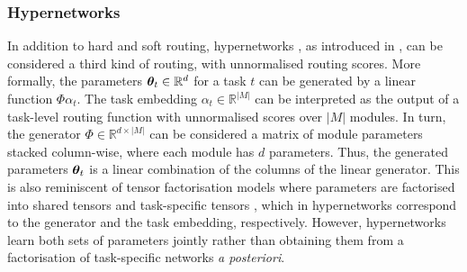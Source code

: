 \documentclass[10pt]{article} %
\begin{document}
\subsubsection{Hypernetworks} \label{sec:routing:hyper_network}

In addition to hard and soft routing, hypernetworks \citep{Ha2017HyperNetworks}, as introduced in , can be considered a third kind of routing, with unnormalised routing scores.  
More formally, the parameters  ${\bm{\theta}}_t \in \mathbb{R}^d$ for a task $t$ can be generated by a linear function $\Phi \alpha_t$. The task embedding $\alpha_t \in \mathbb{R}^{|M|}$ can be interpreted as the output of a task-level routing function with unnormalised scores over $|M|$ modules. In turn, the generator $\Phi \in \mathbb{R}^{d \times |M|}$ can be considered a matrix of module parameters stacked column-wise, where each module has $d$ parameters. Thus, the generated parameters ${\bm{\theta}}_t$ is a linear combination of the columns of the linear generator. This is also reminiscent of tensor factorisation models where parameters are factorised into shared tensors and task-specific tensors \citep{Yang2016Deep}, which in hypernetworks correspond to the generator and the task embedding, respectively. However, hypernetworks learn both sets of parameters jointly rather than obtaining them from a factorisation of task-specific networks \textit{a posteriori}. 
\end{document}
